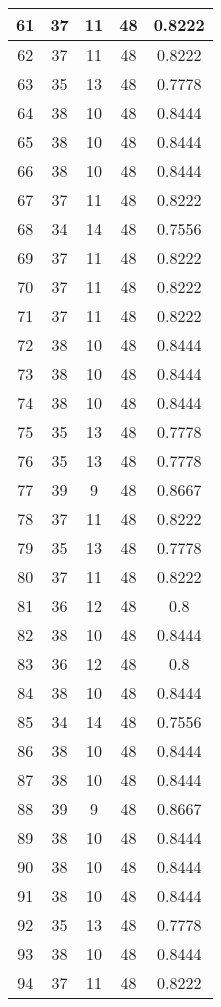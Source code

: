 \documentclass[letterpaper, 12pt]{article}
\begin{document}
\begin{longtable}{|c|c|c|c|c|}
\hline
61 & 37 & 11 & 48 & 0.8222 \\
\hline
62 & 37 & 11 & 48 & 0.8222 \\
\hline
63 & 35 & 13 & 48 & 0.7778 \\
\hline
64 & 38 & 10 & 48 & 0.8444 \\
\hline
65 & 38 & 10 & 48 & 0.8444 \\
\hline
66 & 38 & 10 & 48 & 0.8444 \\
\hline
67 & 37 & 11 & 48 & 0.8222 \\
\hline
68 & 34 & 14 & 48 & 0.7556 \\
\hline
69 & 37 & 11 & 48 & 0.8222 \\
\hline
70 & 37 & 11 & 48 & 0.8222 \\
\hline
71 & 37 & 11 & 48 & 0.8222 \\
\hline
72 & 38 & 10 & 48 & 0.8444 \\
\hline
73 & 38 & 10 & 48 & 0.8444 \\
\hline
74 & 38 & 10 & 48 & 0.8444 \\
\hline
75 & 35 & 13 & 48 & 0.7778 \\
\hline
76 & 35 & 13 & 48 & 0.7778 \\
\hline
77 & 39 & 9 & 48 & 0.8667 \\
\hline
78 & 37 & 11 & 48 & 0.8222 \\
\hline
79 & 35 & 13 & 48 & 0.7778 \\
\hline
80 & 37 & 11 & 48 & 0.8222 \\
\hline
81 & 36 & 12 & 48 & 0.8 \\
\hline
82 & 38 & 10 & 48 & 0.8444 \\
\hline
83 & 36 & 12 & 48 & 0.8 \\
\hline
84 & 38 & 10 & 48 & 0.8444 \\
\hline
85 & 34 & 14 & 48 & 0.7556 \\
\hline
86 & 38 & 10 & 48 & 0.8444 \\
\hline
87 & 38 & 10 & 48 & 0.8444 \\
\hline
88 & 39 & 9 & 48 & 0.8667 \\
\hline
89 & 38 & 10 & 48 & 0.8444 \\
\hline
90 & 38 & 10 & 48 & 0.8444 \\
\hline
91 & 38 & 10 & 48 & 0.8444 \\
\hline
92 & 35 & 13 & 48 & 0.7778 \\
\hline
93 & 38 & 10 & 48 & 0.8444 \\
\hline
94 & 37 & 11 & 48 & 0.8222 \\

\end{longtable}
\end{document}
